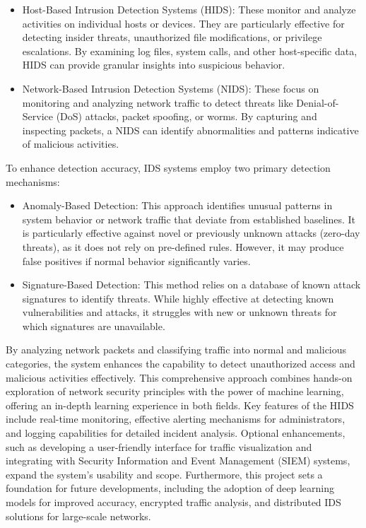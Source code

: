 \documentclass[oneside, english]{reports/assets/sdqtechreport}
\begin{document}
\begin{itemize}
	\item Host-Based Intrusion Detection Systems (HIDS): These monitor and analyze
	      activities on individual hosts or devices. They are particularly effective for
	      detecting insider threats, unauthorized file modifications, or privilege
	      escalations. By examining log files, system calls, and other host-specific
	      data, HIDS can provide granular insights into suspicious behavior.
	\item Network-Based Intrusion Detection Systems (NIDS): These focus on monitoring and
	      analyzing network traffic to detect threats like Denial-of-Service (DoS)
	      attacks, packet spoofing, or worms. By capturing and inspecting packets, a NIDS
	      can identify abnormalities and patterns indicative of malicious activities.
\end{itemize}
To enhance detection accuracy, IDS systems employ two primary detection mechanisms:
\begin{itemize}
	\item Anomaly-Based Detection: This approach identifies unusual patterns in system
	      behavior or network traffic that deviate from established baselines. It is
	      particularly effective against novel or previously unknown attacks (zero-day
	      threats), as it does not rely on pre-defined rules. However, it may produce
	      false positives if normal behavior significantly varies.
	\item Signature-Based Detection: This method relies on a database of known attack
	      signatures to identify threats. While highly effective at detecting known
	      vulnerabilities and attacks, it struggles with new or unknown threats for which
	      signatures are unavailable.
\end{itemize}

By analyzing network packets and classifying traffic into normal and malicious
categories, the system enhances the capability to detect unauthorized access
and malicious activities effectively. This comprehensive approach combines
hands-on exploration of network security principles with the power of machine
learning, offering an in-depth learning experience in both fields. Key features
of the HIDS include real-time monitoring, effective alerting mechanisms for
administrators, and logging capabilities for detailed incident analysis.
Optional enhancements, such as developing a user-friendly interface for traffic
visualization and integrating with Security Information and Event Management
(SIEM) systems, expand the system's usability and scope. Furthermore, this
project sets a foundation for future developments, including the adoption of
deep learning models for improved accuracy, encrypted traffic analysis, and
distributed IDS solutions for large-scale networks.
\end{document}
